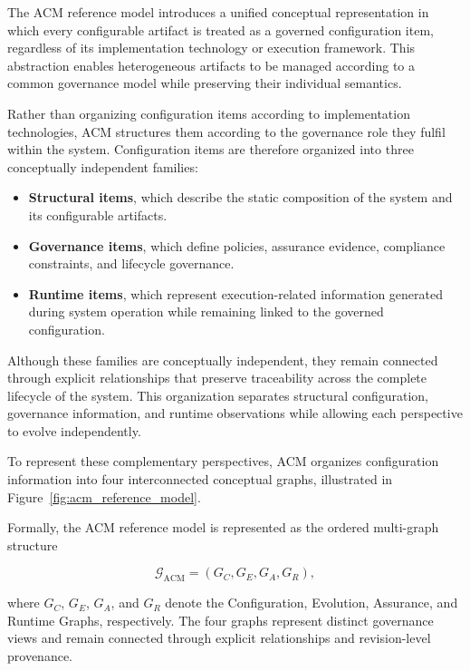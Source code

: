 \documentclass[10pt]{article}
\begin{document}
The ACM reference model introduces a unified conceptual representation in which every configurable artifact is treated as a governed configuration item, regardless of its implementation technology or execution framework. This abstraction enables heterogeneous artifacts to be managed according to a common governance model while preserving their individual semantics.

Rather than organizing configuration items according to implementation technologies, ACM structures them according to the governance role they fulfil within the system. Configuration items are therefore organized into three conceptually independent families:

\begin{itemize}

\item \textbf{Structural items}, which describe the static composition of the system and its configurable artifacts.

\item \textbf{Governance items}, which define policies, assurance evidence, compliance constraints, and lifecycle governance.

\item \textbf{Runtime items}, which represent execution-related information generated during system operation while remaining linked to the governed configuration.

\end{itemize}

Although these families are conceptually independent, they remain connected through explicit relationships that preserve traceability across the complete lifecycle of the system. This organization separates structural configuration, governance information, and runtime observations while allowing each perspective to evolve independently.

To represent these complementary perspectives, ACM organizes configuration information into four interconnected conceptual graphs, illustrated in Figure~\ref{fig:acm_reference_model}.

Formally, the ACM reference model is represented as the ordered multi-graph structure

\begin{equation}
	\mathcal{G}_{\mathrm{ACM}}
	=
	\left(
	G_C,
	G_E,
	G_A,
	G_R
	\right),
	\label{eq:acm_multigraph_structure}
\end{equation}

where $G_C$, $G_E$, $G_A$, and $G_R$ denote the Configuration, Evolution, Assurance, and Runtime Graphs, respectively. The four graphs represent distinct governance views and remain connected through explicit relationships and revision-level provenance.
\end{document}
